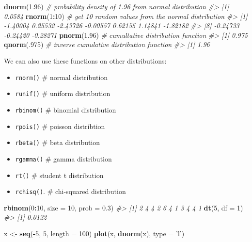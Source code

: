\documentclass[]{book}
\newenvironment{Shaded}{\begin{snugshade}}{\end{snugshade}}
\newcommand{\KeywordTok}[1]{\textcolor[rgb]{0.13,0.29,0.53}{\textbf{#1}}}
\newcommand{\DataTypeTok}[1]{\textcolor[rgb]{0.13,0.29,0.53}{#1}}
\newcommand{\DecValTok}[1]{\textcolor[rgb]{0.00,0.00,0.81}{#1}}
\newcommand{\FloatTok}[1]{\textcolor[rgb]{0.00,0.00,0.81}{#1}}
\newcommand{\StringTok}[1]{\textcolor[rgb]{0.31,0.60,0.02}{#1}}
\newcommand{\CommentTok}[1]{\textcolor[rgb]{0.56,0.35,0.01}{\textit{#1}}}
\newcommand{\OperatorTok}[1]{\textcolor[rgb]{0.81,0.36,0.00}{\textbf{#1}}}
\newcommand{\NormalTok}[1]{#1}
\providecommand{\tightlist}{%
  \setlength{\itemsep}{0pt}\setlength{\parskip}{0pt}}
\begin{document}
\begin{Shaded}
\begin{Highlighting}[]
\KeywordTok{dnorm}\NormalTok{(}\FloatTok{1.96}\NormalTok{) }\CommentTok{# probability density of 1.96 from normal distribution}
\CommentTok{#> [1] 0.0584}
\KeywordTok{rnorm}\NormalTok{(}\DecValTok{1}\OperatorTok{:}\DecValTok{10}\NormalTok{) }\CommentTok{# get 10 random values from the normal distribution}
\CommentTok{#>  [1] -1.40004  0.25532 -2.43726 -0.00557  0.62155  1.14841 -1.82182}
\CommentTok{#>  [8] -0.24733 -0.24420 -0.28271}
\KeywordTok{pnorm}\NormalTok{(}\FloatTok{1.96}\NormalTok{) }\CommentTok{# cumultative distribution function}
\CommentTok{#> [1] 0.975}
\KeywordTok{qnorm}\NormalTok{(.}\DecValTok{975}\NormalTok{) }\CommentTok{# inverse cumulative distribution function}
\CommentTok{#> [1] 1.96}
\end{Highlighting}
\end{Shaded}

We can also use these functions on other distributions:

\begin{itemize}
\tightlist
\item
  \texttt{rnorm()} \# normal distribution
\item
  \texttt{runif()} \# uniform distribution
\item
  \texttt{rbinom()} \# binomial distribution
\item
  \texttt{rpois()} \# poisson distribtion
\item
  \texttt{rbeta()} \# beta distribution
\item
  \texttt{rgamma()} \# gamma distribution
\item
  \texttt{rt()} \# student t distribution
\item
  \texttt{rchisq()}. \# chi-squared distribution
\end{itemize}

\begin{Shaded}
\begin{Highlighting}[]
\KeywordTok{rbinom}\NormalTok{(}\DecValTok{0}\OperatorTok{:}\DecValTok{10}\NormalTok{, }\DataTypeTok{size =} \DecValTok{10}\NormalTok{, }\DataTypeTok{prob =} \FloatTok{0.3}\NormalTok{)}
\CommentTok{#>  [1] 2 4 4 2 6 4 1 3 4 4 1}
\KeywordTok{dt}\NormalTok{(}\DecValTok{5}\NormalTok{, }\DataTypeTok{df =} \DecValTok{1}\NormalTok{)}
\CommentTok{#> [1] 0.0122}

\NormalTok{x <-}\StringTok{ }\KeywordTok{seq}\NormalTok{(}\OperatorTok{-}\DecValTok{5}\NormalTok{, }\DecValTok{5}\NormalTok{, }\DataTypeTok{length =} \DecValTok{100}\NormalTok{)}
\KeywordTok{plot}\NormalTok{(x, }\KeywordTok{dnorm}\NormalTok{(x), }\DataTypeTok{type =} \StringTok{'l'}\NormalTok{)}
\end{Highlighting}
\end{Shaded}
\end{document}
